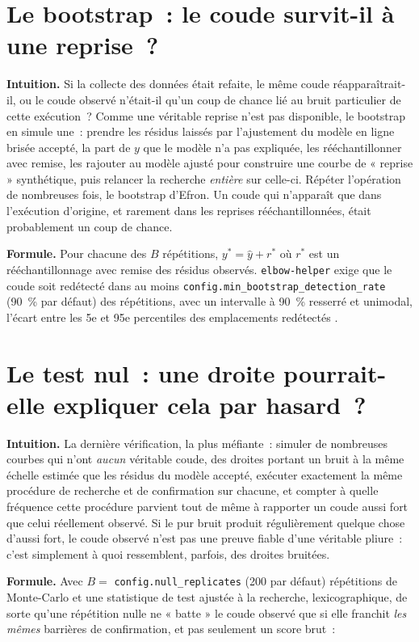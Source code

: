 \documentclass[11pt]{article}
\newcommand{\code}[1]{\texttt{#1}}
\begin{document}
\section{Le bootstrap~: le coude survit-il à une reprise~?}

\textbf{Intuition.} Si la collecte des données était refaite, le même
coude réapparaîtrait-il, ou le coude observé n'était-il qu'un coup de
chance lié au bruit particulier de cette exécution~? Comme une véritable
reprise n'est pas disponible, le bootstrap en simule une~: prendre les
résidus laissés par l'ajustement du modèle en ligne brisée accepté, la part
de $y$ que le modèle n'a pas expliquée, les rééchantillonner avec remise,
les rajouter au modèle ajusté pour construire une courbe de « reprise »
synthétique, puis relancer la recherche \emph{entière} sur celle-ci.
Répéter l'opération de nombreuses fois, le bootstrap d'Efron. Un coude qui
n'apparaît que dans l'exécution d'origine, et rarement dans les reprises
rééchantillonnées, était probablement un coup de chance.

\textbf{Formule.} Pour chacune des $B$ répétitions, $y^\ast = \hat y +
r^\ast$ où $r^\ast$ est un rééchantillonnage avec remise des résidus
observés. \code{elbow-helper} exige que le coude soit redétecté dans au
moins \code{config.min\_bootstrap\_detection\_rate} (90~\% par défaut) des
répétitions, avec un intervalle à 90~\% resserré et unimodal, l'écart entre
les 5e et 95e percentiles des emplacements redétectés \citep{efron1979}
\citep{hastie2009esl}.

\section{Le test nul~: une droite pourrait-elle expliquer cela par hasard~?}
\label{sec:test-nul}

\textbf{Intuition.} La dernière vérification, la plus méfiante~: simuler
de nombreuses courbes qui n'ont \emph{aucun} véritable coude, des droites
portant un bruit à la même échelle estimée que les résidus du modèle
accepté, exécuter exactement la même procédure de recherche et de
confirmation sur chacune, et compter à quelle fréquence cette procédure
parvient tout de même à rapporter un coude aussi fort que celui réellement
observé. Si le pur bruit produit régulièrement quelque chose d'aussi fort,
le coude observé n'est pas une preuve fiable d'une véritable pliure~: c'est
simplement à quoi ressemblent, parfois, des droites bruitées.

\textbf{Formule.} Avec $B = $ \code{config.null\_replicates} (200 par
défaut) répétitions de Monte-Carlo et une statistique de test ajustée à la
recherche, lexicographique, de sorte qu'une répétition nulle ne « batte »
le coude observé que si elle franchit \emph{les mêmes} barrières de
confirmation, et pas seulement un score brut~:
\end{document}
